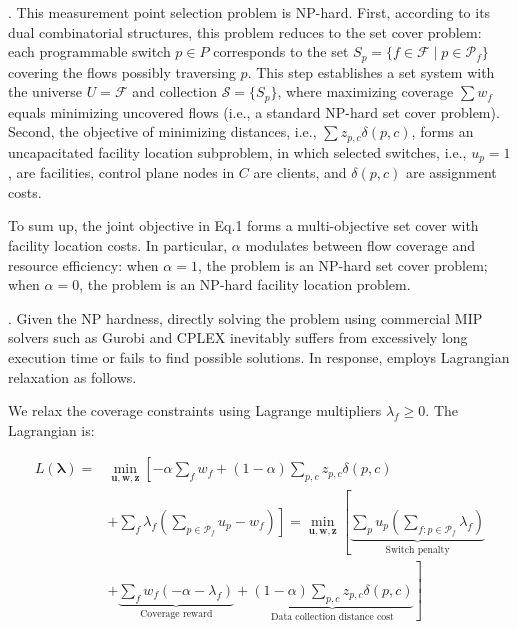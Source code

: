 . This measurement point selection problem is NP-hard. First, according to its dual combinatorial structures, this problem reduces to the set cover problem: each programmable switch $p \in P$ corresponds to the set $S_p = \{ f \in \mathcal{F} \mid p \in \mathcal{P}_f \}$ covering the flows possibly traversing $p$. This step establishes a set system with the universe $U = \mathcal{F}$ and collection $\mathcal{S} = \{ S_p \}$, where maximizing coverage $\sum w_f$ equals minimizing uncovered flows (i.e., a standard NP-hard set cover problem). Second, the objective of minimizing distances, i.e., $\sum z_{p,c} \delta(p,c)$, forms an uncapacitated facility location subproblem, in which selected switches, i.e., $u_p=1$, are facilities, control plane nodes in $C$ are clients, and $\delta(p,c)$ are assignment costs. 

To sum up, the joint objective in Eq.1 forms a multi-objective set cover with facility location costs. In particular, $\alpha$ modulates between flow coverage and resource efficiency: when $\alpha=1$, the problem is an NP-hard set cover problem; when $\alpha=0$, the problem is an NP-hard facility location problem.  


. Given the NP hardness, directly solving the problem using commercial MIP solvers such as Gurobi \cite{gurobi} and CPLEX \cite{cplex} inevitably suffers from excessively long execution time or fails to find possible solutions. In response, \sysname employs Lagrangian relaxation as follows.

We relax the coverage constraints using Lagrange multipliers \(\lambda_f \geq 0\). The Lagrangian is:

\vspace{-10pt}
{\footnotesize
\begin{align}
L(\boldsymbol{\lambda}) = &\min_{\mathbf{u},\mathbf{w},\mathbf{z}} \left[ 
-\alpha \sum_{f} w_f + (1-\alpha) \sum_{p,c} z_{p,c} \delta(p,c) \right. \nonumber \\ &\left. + \sum_{f} \lambda_f \left( \sum_{p \in \mathcal{P}_f} u_p - w_f \right)
\right] 
= \min_{\mathbf{u},\mathbf{w},\mathbf{z}} \left[ 
\underbrace{\sum_{p} u_p \left( \sum_{f: p \in \mathcal{P}_f} \lambda_f \right)}_{\text{Switch penalty}} \right. \nonumber \\ &+ \left.
\underbrace{\sum_{f} w_f (-\alpha - \lambda_f)}_{\text{Coverage reward}} +
\underbrace{(1-\alpha) \sum_{p,c} z_{p,c} \delta(p,c)}_{\text{Data collection distance cost}}
\right]
\end{align}}
\vspace{-7pt}

